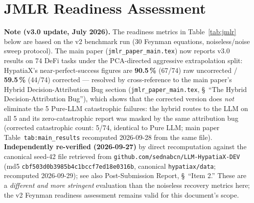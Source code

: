 \documentclass[twoside,11pt]{article}
\begin{document}
\section{JMLR Readiness Assessment}
\label{sec:jmlr}

\noindent\textbf{Note (v3.0 update, July 2026).}
The readiness metrics in Table~\ref{tab:jmlr} below are based on the v2
benchmark run (30 Feynman equations, noiseless/noise sweep protocol).
The main paper (\texttt{jmlr\_paper\_main.tex}) now reports v3.0
results on 74 DeFi tasks under the PCA-directed aggressive extrapolation
split: HypatiaX's near-perfect-success figures are \textbf{90.5\,\%} (67/74) raw
uncorrected / \textbf{59.5\,\%} (44/74) corrected --- resolved by
cross-reference to the main paper's Hybrid Decision-Attribution Bug
section (\texttt{jmlr\_paper\_main.tex}, \S~``The Hybrid
Decision-Attribution Bug''), which shows that the corrected version does
\emph{not} eliminate the 5 Pure-LLM catastrophic failures: the hybrid
routes to the LLM on all 5 and its zero-catastrophic report was masked by the
same attribution bug (corrected catastrophic count: 5/74, identical to Pure LLM;
main paper Table~\texttt{tab:main\_results} recomputed 2026-09-28 from the same file). \textbf{Independently
re-verified (2026-09-27)} by direct recomputation against the canonical
seed-42 file retrieved from
\texttt{github.com/sednabcn/LLM-HypatiaX-DEV} (md5
\texttt{cbf503d0b3985b4c1bccf7ed18e0316b}, canonical \texttt{hypatiax/data}; recomputed 2026-09-29); see also Post-Submission
Report, \S~``Item 2.'' These are a \emph{different and more stringent}
evaluation than the noiseless recovery metrics here; the v2 Feynman readiness
assessment remains valid for this document's scope.
\end{document}
